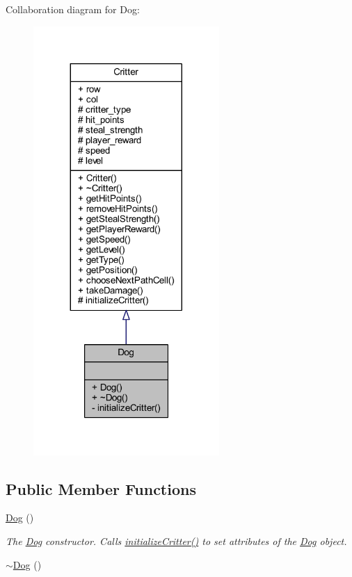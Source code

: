 Collaboration diagram for Dog\+:
\nopagebreak
\begin{figure}[H]
\begin{center}
\leavevmode
\includegraphics[width=200pt]{class_dog__coll__graph}
\end{center}
\end{figure}
\subsection*{Public Member Functions}
\begin{DoxyCompactItemize}
\item 
\hyperlink{class_dog_a16e01978bb90b2989ee3da3e87071b1b}{Dog} ()
\begin{DoxyCompactList}\small\item\em The \hyperlink{class_dog}{Dog} constructor. Calls \hyperlink{class_dog_ab512ed7b74de6ab907e4199f98d82566}{initialize\+Critter()} to set attributes of the \hyperlink{class_dog}{Dog} object. \end{DoxyCompactList}\item 
\hyperlink{class_dog_aeacf410641eab28eabea6bc5269eb4ef}{$\sim$\+Dog} ()
\end{DoxyCompactItemize}
